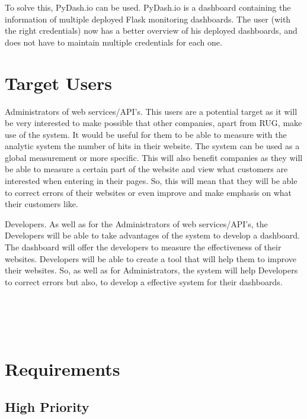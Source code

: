To solve this, PyDash.io can be used. PyDash.io is a dashboard
containing the information of multiple deployed Flask monitoring
dashboards. The user (with the right credentials) now has a better
overview of his deployed dashboards, and does not have to maintain
multiple credentials for each one.

\hypertarget{target-users}{%
\section{Target Users}\label{target-users}}

Administrators of web services/API's. This users are a potential target
as it will be very interested to make possible that other companies,
apart from RUG, make use of the system. It would be useful for them to
be able to measure with the analytic system the number of hits in their
website. The system can be used as a global measurement or more
specific. This will also benefit companies as they will be able to
measure a certain part of the website and view what customers are
interested when entering in their pages. So, this will mean that they
will be able to correct errors of their websites or even improve and
make emphasis on what their customers like.

Developers. As well as for the Administrators of web services/API's, the
Developers will be able to take advantages of the system to develop a
dashboard. The dashboard will offer the developers to measure the
effectiveness of their websites. Developers will be able to create a
tool that will help them to improve their websites. So, as well as for
Administrators, the system will help Developers to correct errors but
also, to develop a effective system for their dashboards.

\hypertarget{section-2}{%
\section{\texorpdfstring{\\
}{ }}\label{section-2}}

\hypertarget{requirements}{%
\section{Requirements}\label{requirements}}

\hypertarget{high-priority}{%
\subsection{High Priority}\label{high-priority}}

